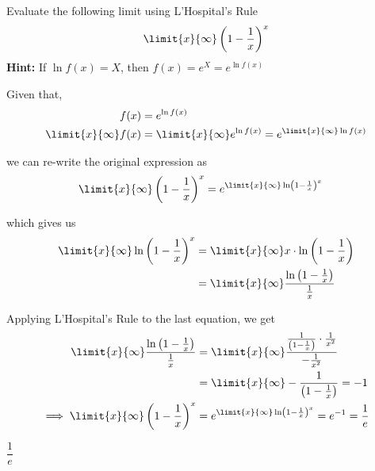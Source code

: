 

\question[4] Evaluate the following limit using L'Hospital's Rule
\[\limit{x}{\infty}\left( 1-\frac{1}{x}\right)^x\] 
\textbf{Hint:} If $\ln f(x)=X$, then $f(x) = e^X = e^{\ln f(x)}$

\begin{solution}[\halfpage]
  Given that,  
  \begin{align}
    f(x) &= e^{\ln f(x)} \\
    \limit{x}{\infty} f(x) &= \limit{x}{\infty} e^{\ln f(x)} = e^{\limit{x}{\infty}\ln f(x)}
  \end{align} 

  we can re-write the original expression as 
  \begin{align}
    \limit{x}{\infty}\left( 1-\frac{1}{x} \right)^x &= e^{\limit{x}{\infty}\ln\left( 1-\frac{1}{x} \right)^x}
  \end{align}

  which gives us 
  \begin{align}
    \limit{x}{\infty}\ln\left( 1-\frac{1}{x} \right)^x &= \limit{x}{\infty}x\cdot\ln\left( 1-\frac{1}{x}\right) \\
    &= \limit{x}{\infty}\dfrac{\ln\left(1-\frac{1}{x}\right)}{\frac{1}{x}}
  \end{align}

  Applying L'Hospital's Rule to the last equation, we get 
  \begin{align}
    \limit{x}{\infty}\dfrac{\ln\left(1-\frac{1}{x}\right)}{\frac{1}{x}} 
    &= \limit{x}{\infty}\dfrac{\frac{1}{\left( 1-\frac{1}{x}\right)}\cdot\frac{1}{x^2}}{-\frac{1}{x^2}} \\
    &= \limit{x}{\infty}-\dfrac{1}{\left( 1-\frac{1}{x}\right)} = -1 \\
    \implies 
    \limit{x}{\infty}\left( 1-\frac{1}{x} \right)^x 
    &= e^{\limit{x}{\infty}\ln\left( 1-\frac{1}{x} \right)^x} = e^{-1} = \dfrac{1}{e}
  \end{align}
\end{solution}

\ifprintanswers\begin{codex}$\dfrac{1}{e}$\end{codex}\fi
